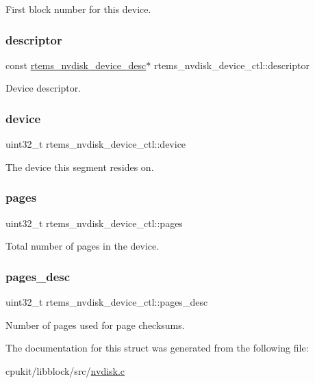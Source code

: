 First block number for this device. \mbox{\label{structrtems__nvdisk__device__ctl_a25ec08a49e1e30929fcf04c65fbdef67}} 
\subsubsection{\texorpdfstring{descriptor}{descriptor}}
{\footnotesize\ttfamily const \mbox{\hyperlink{structrtems__nvdisk__device__desc}{rtems\+\_\+nvdisk\+\_\+device\+\_\+desc}}$\ast$ rtems\+\_\+nvdisk\+\_\+device\+\_\+ctl\+::descriptor}

Device descriptor. \mbox{\label{structrtems__nvdisk__device__ctl_a8c5bca6cf01a61e069b5372e06fe0e1f}} 
\subsubsection{\texorpdfstring{device}{device}}
{\footnotesize\ttfamily uint32\+\_\+t rtems\+\_\+nvdisk\+\_\+device\+\_\+ctl\+::device}

The device this segment resides on. \mbox{\label{structrtems__nvdisk__device__ctl_a2ea6d757d10c0cb5cd9577aa0f3c9c3d}} 
\subsubsection{\texorpdfstring{pages}{pages}}
{\footnotesize\ttfamily uint32\+\_\+t rtems\+\_\+nvdisk\+\_\+device\+\_\+ctl\+::pages}

Total number of pages in the device. \mbox{\label{structrtems__nvdisk__device__ctl_a73b8ba11cb9191f6c99ae735e886b0af}} 
\subsubsection{\texorpdfstring{pages\_desc}{pages\_desc}}
{\footnotesize\ttfamily uint32\+\_\+t rtems\+\_\+nvdisk\+\_\+device\+\_\+ctl\+::pages\+\_\+desc}

Number of pages used for page checksums. 

The documentation for this struct was generated from the following file\+:\begin{DoxyCompactItemize}
\item 
cpukit/libblock/src/\mbox{\hyperlink{nvdisk_8c}{nvdisk.\+c}}\end{DoxyCompactItemize}
